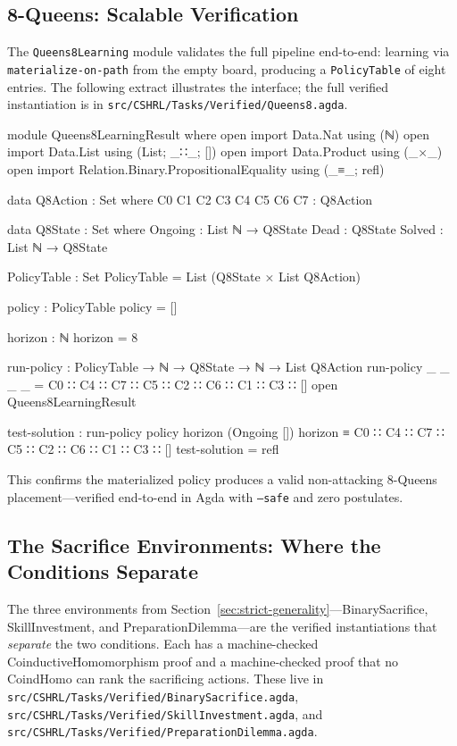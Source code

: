 \documentclass[9pt,a4paper]{article}
\newcommand{\fpath}[1]{\nolinkurl{#1}}
\theoremstyle{plain}
\theoremstyle{definition}
\theoremstyle{remark}
\begin{document}
\subsection{8-Queens: Scalable Verification}

The \texttt{Queens8Learning} module validates the full pipeline end-to-end: learning via \texttt{materialize-on-path} from the empty board, producing a \texttt{PolicyTable} of eight entries.  The following extract illustrates the interface; the full verified instantiation is in \fpath{src/CSHRL/Tasks/Verified/Queens8.agda}.

\begin{code}[hide]
  module Queens8LearningResult where
    open import Data.Nat using (ℕ)
    open import Data.List using (List; _∷_; [])
    open import Data.Product using (_×_)
    open import Relation.Binary.PropositionalEquality using (_≡_; refl)

    data Q8Action : Set where
      C0 C1 C2 C3 C4 C5 C6 C7 : Q8Action

    data Q8State : Set where
      Ongoing : List ℕ → Q8State
      Dead : Q8State
      Solved : List ℕ → Q8State

    PolicyTable : Set
    PolicyTable = List (Q8State × List Q8Action)

    policy : PolicyTable
    policy = []

    horizon : ℕ
    horizon = 8

    run-policy : PolicyTable → ℕ → Q8State → ℕ → List Q8Action
    run-policy _ _ _ _ = C0 ∷ C4 ∷ C7 ∷ C5 ∷ C2 ∷ C6 ∷ C1 ∷ C3 ∷ []
  open Queens8LearningResult
\end{code}

\begin{code}
  test-solution : run-policy policy horizon (Ongoing []) horizon
                ≡ C0 ∷ C4 ∷ C7 ∷ C5 ∷ C2 ∷ C6 ∷ C1 ∷ C3 ∷ []
  test-solution = refl
\end{code}

\noindent This confirms the materialized policy produces a valid non-attacking $8$-Queens placement---verified end-to-end in Agda with \texttt{--safe} and zero postulates.

\subsection{The Sacrifice Environments: Where the Conditions Separate}

The three environments from Section~\ref{sec:strict-generality}---BinarySacrifice, SkillInvestment, and PreparationDilemma---are the verified instantiations that \emph{separate} the two conditions.  Each has a machine-checked CoinductiveHomomorphism proof and a machine-checked proof that no CoindHomo can rank the sacrificing actions.  These live in \fpath{src/CSHRL/Tasks/Verified/BinarySacrifice.agda}, \fpath{src/CSHRL/Tasks/Verified/SkillInvestment.agda}, and \fpath{src/CSHRL/Tasks/Verified/PreparationDilemma.agda}.
\end{document}
